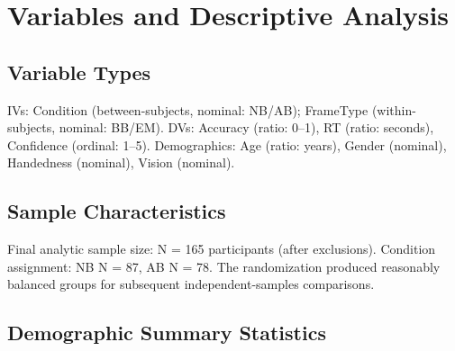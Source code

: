 \documentclass[11pt]{article}
\begin{document}
\section{Variables and Descriptive Analysis}
\subsection{Variable Types}
IVs: Condition (between-subjects, nominal: NB/AB); FrameType (within-subjects, nominal: BB/EM). DVs: Accuracy (ratio: 0--1), RT (ratio: seconds), Confidence (ordinal: 1--5). Demographics: Age (ratio: years), Gender (nominal), Handedness (nominal), Vision (nominal).

\subsection{Sample Characteristics}
Final analytic sample size: N = 165 participants (after exclusions). Condition assignment: NB N = 87, AB N = 78. The randomization produced reasonably balanced groups for subsequent independent-samples comparisons.

\subsection{Demographic Summary Statistics}
\begin{table}[htbp]
\centering
\small
\caption{Participant demographics (complete records)}
\end{table}

\begin{table}[htbp]
\centering
\small
\caption{Demographics by condition}
\end{table}
\end{document}
